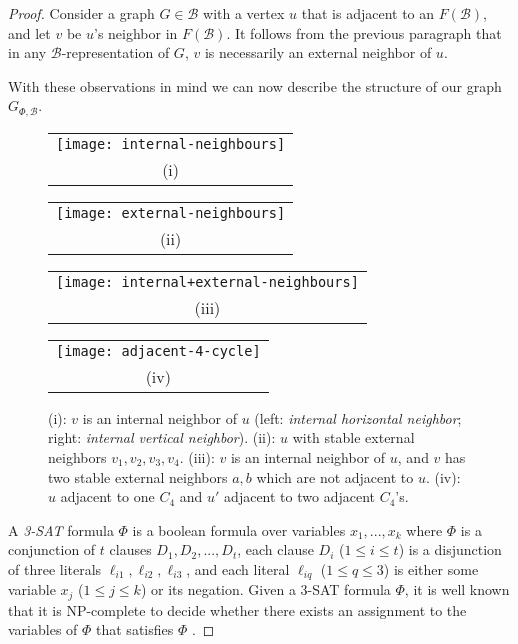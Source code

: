 \documentclass[11pt,3p,times]{elsarticle}
\newenvironment{myproof}{\begin{proof}}{\end{proof}}
\begin{document}
\begin{myproof}
Consider a graph $G \in \mathcal{B}$ with a vertex $u$ that is adjacent to an
$F(\mathcal{B})$, and let $v$ be $u$'s neighbor in $F(\mathcal{B})$. It follows
from the previous paragraph that in any $\mathcal{B}$-representation of $G$, $v$ is
necessarily an external neighbor of $u$.

With these observations
in mind we can now describe the structure of our graph $G_{\Phi,\mathcal{B}}$.
\begin{figure}[h]
\begin{tabular}{c}
\texttt{[image: internal-neighbours]} \\
(i)
\end{tabular}
\hfill
\begin{tabular}{c}
\texttt{[image: external-neighbours]}\\
(ii)
\end{tabular}
\hfill
\begin{tabular}{c}
\texttt{[image: internal+external-neighbours]}\\
(iii)
\end{tabular}
\hfill
\begin{tabular}{c}
\texttt{[image: adjacent-4-cycle]}\\
(iv)
\end{tabular}
\caption{(i): $v$ is an internal neighbor of $u$ (left:
\emph{internal horizontal  neighbor}; right: \emph{internal
vertical neighbor}). (ii): $u$ with stable external neighbors
$v_1,v_2,v_3,v_4$. (iii): $v$ is an internal neighbor of $u$, and
$v$ has two stable external neighbors $a,b$ which are not adjacent
to $u$. (iv): $u$ adjacent to one $C_4$ and $u'$ adjacent to two
adjacent $C_4$'s.} \label{fig:internal-external}
\end{figure}
A \emph{3-SAT} formula $\Phi$ is a boolean formula over variables
$x_1, ..., x_k$ where $\Phi$ is a conjunction of $t$ clauses
$D_1, D_2, ..., D_t$, each clause $D_i$ ($1\leq i \leq t$) is a
disjunction of three literals $\ell_{i1}, \ell_{i2}, \ell_{i3}$,
and each literal $\ell_{iq}$ ($1\leq q \leq 3$) is either
some variable $x_j$ ($1 \leq j \leq k$)
or its negation.
Given a 3-SAT formula $\Phi$, it is well known that it is
NP-complete to decide whether there exists an assignment to the
variables of $\Phi$ that satisfies $\Phi$ \cite{Kar1972}.


\end{myproof}
\end{document}
